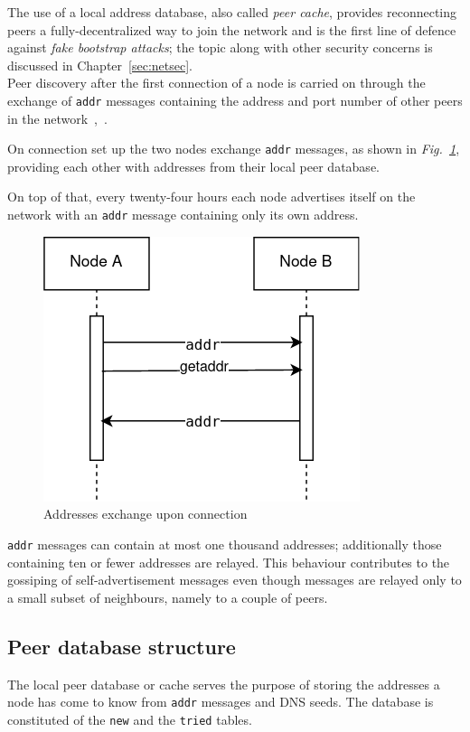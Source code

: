 \documentclass[12pt, letterpaper, twoside]{article}
\begin{document}
The use of a local address database, also called \emph{peer cache}, provides reconnecting peers a fully-decentralized way to join the network and is the first line of defence against \emph{fake bootstrap attacks}; the topic along with other security concerns is discussed in Chapter~\ref{sec:netsec}.\\

Peer discovery after the first connection of a node is carried on through the exchange of \texttt{addr} messages containing the address and port number of other peers in the network~\cite{protocoldoc},~\cite{devguidep2p}.

On connection set up the two nodes exchange \texttt{addr} messages, as shown in \emph{Fig.~\ref{fig:addr}}, providing each other with addresses from their local peer database.

On top of that, every twenty-four hours each node advertises itself on the network with an \texttt{addr} message containing only its own address.

\begin{figure}[h]
	\includegraphics[width=.45\textwidth]{pict/BTCaddr.png}
	\centering
	\caption{Addresses exchange upon connection}
	\label{fig:addr}
\end{figure}

\texttt{addr} messages can contain at most one thousand addresses; additionally those containing ten or fewer addresses are relayed. This behaviour contributes to the gossiping of self-advertisement messages even though messages are relayed only to a small subset of neighbours, namely to a couple of peers.

\subsection{Peer database structure}\label{sec:cachestruct}
The local peer database or cache serves the purpose of storing the addresses a node has come to know from \texttt{addr} messages and DNS seeds. The database is constituted of the \texttt{new} and the \texttt{tried} tables.
\end{document}

